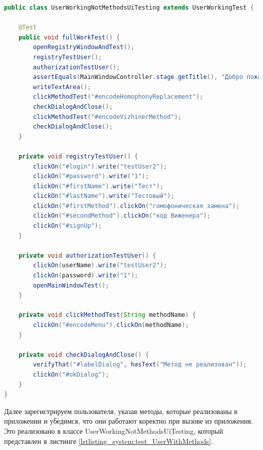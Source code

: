 \documentclass[a4paper,12pt]{article}
\begin{document}
\begin{lstlisting}[language=java, caption=код класса UserWorkingNotMethodsUiTesting, label=lstlisting_system:test_UserWithNotMethods]
public class UserWorkingNotMethodsUiTesting extends UserWorkingTest {

    @Test
    public void fullWorkTest() {
        openRegistryWindowAndTest();
        registryTestUser();
        authorizationTestUser();
        assertEquals(MainWindowController.stage.getTitle(), "Добро пожаловать, Тест");
        writeTextArea();
        clickMethodTest("#encodeHomophonyReplacement");
        checkDialogAndClose();
        clickMethodTest("#encodeVizhinerMethod");
        checkDialogAndClose();
    }

    private void registryTestUser() {
        clickOn("#login").write("testUser2");
        clickOn("#password").write("1");
        clickOn("#firstName").write("Тест");
        clickOn("#lastName").write("Тестовый");
        clickOn("#firstMethod").clickOn("гомофоническая замена");
        clickOn("#secondMethod").clickOn("код Виженера");
        clickOn("#signUp");
    }

    private void authorizationTestUser() {
        clickOn(userName).write("testUser2");
        clickOn(password).write("1");
        openMainWindowTest();
    }

    private void clickMethodTest(String methodName) {
        clickOn("#encodeMenu").clickOn(methodName);
    }

    private void checkDialogAndClose() {
        verifyThat("#labelDialog", hasText("Метод не реализован"));
        clickOn("#okDialog");
    }
}
\end{lstlisting}

Далее зарегистрируем пользователя, указав методы, которые реализованы в приложении и убедимся, что они работают коректно при вызове из приложения.  Это реализовано в классе UserWorkingNotMethodsUiTesting, который представлен в листинге \ref{lstlisting_system:test_UserWithMethods}.
\end{document}
